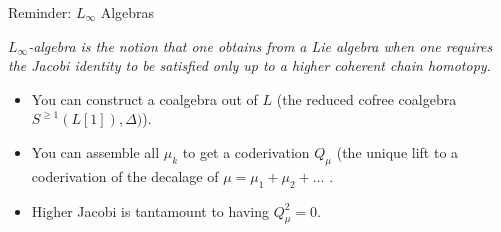 \documentclass[beamer,10pt,handout]{standalone}  \Handouttrue
\begin{document}


\begin{frame}{Reminder: $L_\infty$ Algebras}

		\emph{
			$L_\infty$-algebra is the notion that one obtains from a Lie algebra when one requires the Jacobi identity to be satisfied only up to a higher coherent chain homotopy.
		}
		\\
		\vspace{.5em}
		\begin{defblock}
			
		\end{defblock}	
	\pause

	\begin{itemize}
		\item<2-> You can construct a coalgebra out of $L$ 
			{\small \color{UniGreen} (the reduced cofree coalgebra $S^{\geq 1}(L[1]),\Delta)$)}.
		\item<3-> You can assemble all $\mu_k$ to get a coderivation $Q_\mu$
				{\small \color{UniGreen} (the unique lift to a coderivation of the decalage of $ \mu=	\mu_1+\mu_2 + \dots$ }.
		\item<4-> Higher Jacobi is tantamount to having $Q_\mu ^2 = 0$.

	\end{itemize}
\end{frame}
\end{document}
